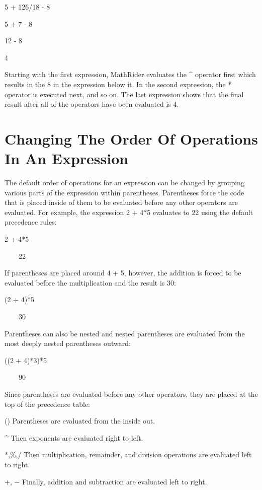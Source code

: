\documentclass[12pt,oneside]{book}
\begin{document}
5 + 126/18 {}- 8

5 + 7 {}- 8

12 {}- 8

4


Starting with the first expression, MathRider evaluates the \^{} operator first which results in the 8 in the expression below it. In the second expression, the * operator is executed next, and so on. The last expression shows that the final result after all of the operators have been evaluated is 4.

\section[Changing The Order Of Operations In An Expression]{Changing The Order Of Operations In An Expression}

The default order of operations for an expression can be changed by grouping various parts of the expression within parentheses. Parentheses force the code that is placed inside of them to be evaluated before any other operators are evaluated. For example, the expression 2 + 4*5 evaluates to 22 using the default precedence rules: 

2 + 4*5

{\textbar}

\ \ \ \ 22


If parentheses are placed around 4 + 5, however, the addition is forced to be evaluated before the multiplication and the result is 30: 


(2 + 4)*5

{\textbar}

\ \ \ \ 30


Parentheses can also be nested and nested parentheses are evaluated from the most deeply nested parentheses outward: 

((2 + 4)*3)*5

{\textbar}

\ \ \ \ 90


Since parentheses are evaluated before any other operators, they are placed at the top of the precedence table: 

() Parentheses are evaluated from the inside out.


\^{} Then exponents are evaluated right to left.


*,\%,/ Then multiplication, remainder, and division operations are evaluated left to right. 

+, $-$ Finally, addition and subtraction are evaluated left to right.
\end{document}
